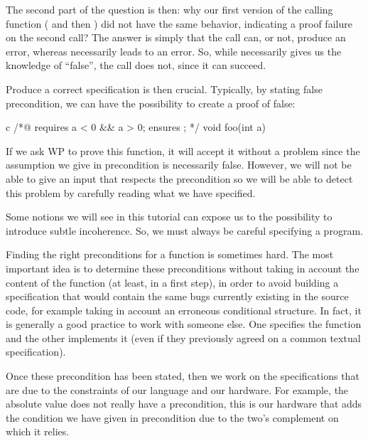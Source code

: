 The second part of the question is then: why our first version of the
calling function ( and then ) did
not have the same behavior, indicating a proof failure on the second
call? The answer is simply that the call  can, or not,
produce an error, whereas  necessarily leads to an
error. So, while  necessarily gives us the
knowledge of ``false'', the call  does not, since it can
succeed.



Produce a correct specification is then crucial. Typically, by stating
false precondition, we can have the possibility to create a proof of
false:



\begin{CodeBlock}{c}
/*@
  requires a < 0 && a > 0;
  ensures  \false;
*/
void foo(int a){

}
\end{CodeBlock}


If we ask WP to prove this function, it will accept it without a problem
since the assumption we give in precondition is necessarily false.
However, we will not be able to give an input that respects the
precondition so we will be able to detect this problem by carefully
reading what we have specified.



Some notions we will see in this tutorial can expose us to the
possibility to introduce subtle incoherence. So, we must always be
careful specifying a program.





Finding the right preconditions for a function is sometimes hard. The
most important idea is to determine these preconditions without taking
in account the content of the function (at least, in a first step), in
order to avoid building a specification that would contain the same bugs
currently existing in the source code, for example taking in account an
erroneous conditional structure. In fact, it is generally a good
practice to work with someone else. One specifies the function and the
other implements it (even if they previously agreed on a common textual
specification).



Once these precondition has been stated, then we work on the
specifications that are due to the constraints of our language and our
hardware. For example, the absolute value does not really have a
precondition, this is our hardware that adds the condition we have given
in precondition due to the two's complement on which it relies.



